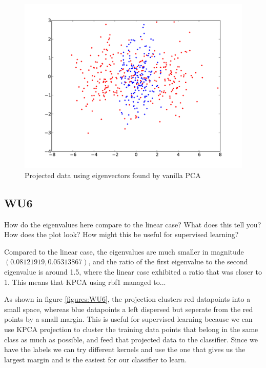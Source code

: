 \documentclass[a4paper,11pt]{article}
\begin{document}
\begin{figure}[!ht]
  \begin{center}
  \includegraphics[width=4.5in]{WU5.pdf}
  \caption{Projected data using eigenvectors found by vanilla PCA}
  \label{figures:WU5}
  \end{center}
\end{figure}

\subsection{WU6}
\textsf{How do the eigenvalues here compare to the linear case? What
does this tell you? How does the plot look? How might this be useful
for supervised learning?}\vspace{0.1in}

Compared to the linear case, the eigenvalues are much smaller in
magnitude $(0.08121919,  0.05313867)$, and the ratio of the first
eigenvalue to the second eigenvalue is around 1.5, where the
linear case exhibited a ratio that was closer to 1. 
This means that KPCA using rbf1 managed to...

As shown in figure \ref{figures:WU6}, the projection clusters 
red datapoints into a small space, whereas blue datapoints a 
left dispersed but seperate from the red points by a small margin.
This is useful for supervised learning because we can use KPCA
projection to cluster the training data points that belong in 
the same class as much as possible, and feed that projected data to the classifier.
Since we have the labels we can try different kernels and use the one
that gives us the largest margin and is the easiest for our classifier to learn.
\end{document}
